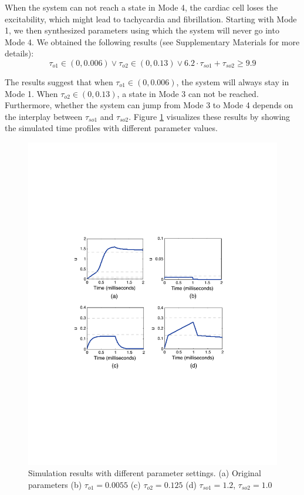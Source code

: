 When the system can not reach a state in Mode 4, the cardiac cell loses the excitability, which might lead to tachycardia and fibrillation. Starting with Mode 1, we then synthesized parameters using which the system will never go into Mode 4. We obtained the following results (see Supplementary Materials for more details):
$$\tau_{o1} \in (0,0.006)\vee \tau_{o2} \in (0,0.13)\vee 6.2 \cdot \tau_{so1} + \tau_{so2} \ge 9.9$$

The results suggest that when $\tau_{o1} \in (0, 0.006)$, the system will always stay in Mode 1. When $\tau_{o2} \in (0, 0.13)$, a state in Mode 3 can not be reached. Furthermore, whether the system can jump from Mode 3 to Mode 4 depends on the interplay between $\tau_{so1}$ and $\tau_{so2}$.  Figure \ref{cresults} visualizes these results by showing the simulated time profiles with different parameter values.



\begin{figure}[h]
\centering
\includegraphics[scale=0.6]{fig-cardiactraj2}
\caption{Simulation results with different parameter settings. (a) Original parameters (b) $\tau_{o1}=0.0055$ (c) $\tau_{o2} = 0.125$ (d) $\tau_{so1} =1.2$, $\tau_{so2} =1.0$ }
\label{cresults}
\end{figure}

